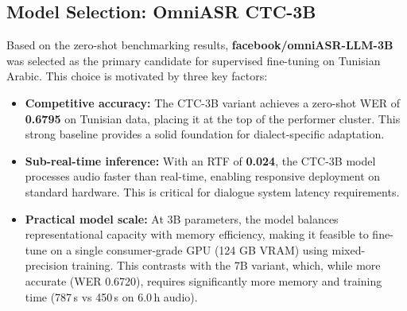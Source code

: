 \documentclass[12pt,a4paper]{report}
\begin{document}




\subsection{Model Selection: OmniASR CTC-3B}

Based on the zero-shot benchmarking results, \textbf{facebook/omniASR-LLM-3B} was selected
as the primary candidate for supervised fine-tuning on Tunisian Arabic. This choice is
motivated by three key factors:

\begin{itemize}
    \item \textbf{Competitive accuracy:} The CTC-3B variant achieves a zero-shot WER of
    \textbf{0.6795} on Tunisian data, placing it at the top of the performer cluster.
    This strong baseline provides a solid foundation for dialect-specific adaptation.

    \item \textbf{Sub-real-time inference:} With an RTF of \textbf{0.024}, the CTC-3B
    model processes audio faster than real-time, enabling responsive deployment on
    standard hardware. This is critical for dialogue system latency requirements.

    \item \textbf{Practical model scale:} At 3B parameters, the model balances
    representational capacity with memory efficiency, making it feasible to fine-tune
    on a single consumer-grade GPU (124 GB VRAM) using mixed-precision training. This
    contrasts with the 7B variant, which, while more accurate (WER 0.6720), requires
    significantly more memory and training time (787\,s vs 450\,s on 6.0\,h audio).
\end{itemize}
\end{document}
